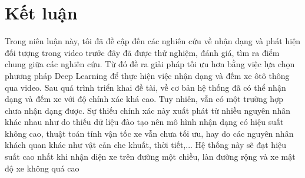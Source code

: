 \chapter*{Kết luận}

Trong niên luận này, tôi đã đề cập đến các nghiên cứu về nhận 
dạng và phát hiện đối tượng trong video trước đây đã được thử nghiệm, 
đánh giá, tìm ra điểm chung giữa các nghiên cứu. Từ đó đề ra giải pháp tối ưu hơn bằng việc lựa chọn phương pháp Deep Learning để thực hiện việc 
nhận dạng và đếm xe ôtô thông qua video.
Sau quá trình triển khai đề tài, về cơ bản hệ thống đã có thể nhận 
dạng và đếm xe với độ chính xác khá cao. Tuy nhiên, vẫn có một trường 
hợp chưa nhận dạng được. Sự thiếu chính xác này xuất phát từ nhiều 
nguyên nhân khác nhau như do thiếu dữ liệu đào tạo nên mô hình nhận 
dạng có hiệu suất không cao, thuật toán tính vận tốc xe vẫn chưa tối ưu, hay do các nguyên nhân khách quan khác như vật cản che khuất, thời tiết,...
Hệ thống này sẽ đạt hiệu suất cao nhất khi nhận diện xe trên đường 
một chiều, làn đường rộng và xe mật độ xe không quá cao
